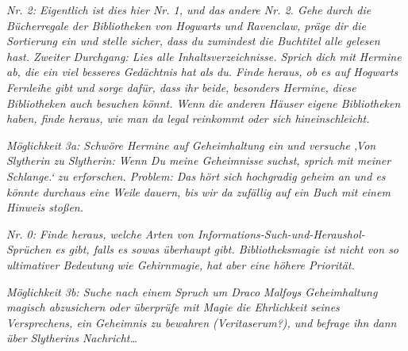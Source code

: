 \emph{Nr. 2: Eigentlich ist dies hier Nr. 1, und das andere Nr. 2. Gehe durch die Bücherregale der Bibliotheken von Hogwarts und Ravenclaw, präge dir die Sortierung ein und stelle sicher, dass du zumindest die Buchtitel alle gelesen hast. Zweiter Durchgang: Lies alle Inhaltsverzeichnisse. Sprich dich mit Hermine ab, die ein viel besseres Gedächtnis hat als du. Finde heraus, ob es auf Hogwarts Fernleihe gibt und sorge dafür, dass ihr beide, besonders Hermine, diese Bibliotheken auch besuchen könnt. Wenn die anderen Häuser eigene Bibliotheken haben, finde heraus, wie man da legal reinkommt oder sich hineinschleicht.}

\emph{Möglichkeit 3a: Schwöre Hermine auf Geheimhaltung ein und versuche ‚Von Slytherin zu Slytherin: Wenn Du meine Geheimnisse suchst, sprich mit meiner Schlange.‘ zu erforschen. Problem: Das hört sich hochgradig geheim an und es könnte durchaus eine Weile dauern, bis wir da zufällig auf ein Buch mit einem Hinweis stoßen.}

\emph{Nr. 0: Finde heraus, welche Arten von Informations-Such-und-Heraushol-Sprüchen es gibt, falls es sowas überhaupt gibt. Bibliotheksmagie ist nicht von so ultimativer Bedeutung wie Gehirnmagie, hat aber eine höhere Priorität.}

\emph{Möglichkeit 3b: Suche nach einem Spruch um Draco Malfoys Geheimhaltung magisch abzusichern oder überprüfe mit Magie die Ehrlichkeit seines Versprechens, ein Geheimnis zu bewahren (Veritaserum?), und befrage ihn dann über Slytherins Nachricht…}

